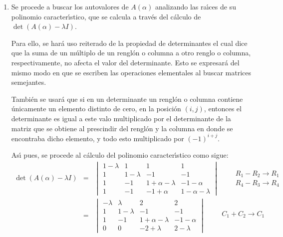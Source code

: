 \begin{solucion}
 $\phantom{0}$
 \begin{enumerate}[$a$)]
  \item Se procede a buscar los autovalores de $A(\alpha)$ analizando las ra\'{\i}ces de su polinomio caracter\'{\i}stico, que se calcula a trav\'es del c\'alculo de $\det\left( A(\alpha) - \lambda I \right)$.
  \par 
  Para ello, se har\'a uso reiterado de la propiedad de determinantes el cual dice que la suma de un m\'ultiplo de un rengl\'on o columna a otro renglo o columna, respectivamente, no afecta el valor del determinante. Esto se expresar\'a del mismo modo en que se escriben las operaciones elementales al buscar matrices semejantes.
  \par 
  Tambi\'en se usar\'a que si en un determinante un rengl\'on o columna contiene \'unicamente un elemento distinto de cero, en la posici\'on $(i,j)$, entonces el determinante es igual a este valo multiplicado por el determinante de la matriz que se obtiene al prescindir del rengl\'on y la columna en donde se encontraba dicho elemento, y todo esto multiplicado por $(-1)^{i+j}$.
  \par 
  As\'{\i} pues, se procede al c\'alculo del polinomio caracter\'{\i}stico como sigue:
  \begin{eqnarray*}
   \det(A(\alpha)-\lambda I) & = & 
   \begin{vmatrix}
    1 - \lambda & 1 & 1 & 1 \\
    1 & 1 - \lambda & -1 & -1 \\
    1 & -1 & 1 + \alpha - \lambda & -1 - \alpha \\
    1 & -1 & -1 + \alpha & 1 - \alpha - \lambda 
   \end{vmatrix}
   \qquad
   \begin{matrix}
    R_1 - R_2 \to R_1 \\
    R_4 - R_3 \to R_4
   \end{matrix}
   \\ 
   & = & 
   \begin{vmatrix}
    -\lambda & \lambda & 2 & 2 \\
    1 & 1-\lambda & -1 & -1 \\
    1 & -1 & 1+\alpha-\lambda & -1-\alpha \\
    0 & 0 & -2 + \lambda & 2 - \lambda
   \end{vmatrix}
   \qquad 
   \begin{matrix}
    C_1 + C_2 \to C_1 \\ 

\end{matrix}
\end{eqnarray*}
\end{enumerate}
\end{solucion}
